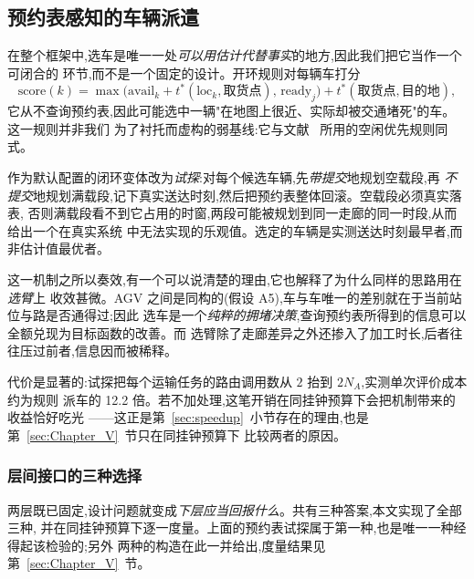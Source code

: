 \documentclass[manuscript,screen,review]{acmart}
\newcommand{\CostMultBefore}{12.2}
\begin{document}
\subsection{预约表感知的车辆派遣}
\label{sec:dispatch}

在整个框架中,选车是唯一一处\emph{可以用估计代替事实}的地方,因此我们把它当作一个可闭合的
环节,而不是一个固定的设计。开环规则对每辆车打分
\begin{equation}
\label{eq:rule}
\mathrm{score}(k)=\max\bigl(\mathrm{avail}_k+t^{*}(\mathrm{loc}_k,\text{取货点}),\,
\mathrm{ready}_j\bigr)+t^{*}(\text{取货点},\text{目的地}),
\end{equation}
它从不查询预约表,因此可能选中一辆"在地图上很近、实际却被交通堵死"的车。这一规则并非我们
为了衬托而虚构的弱基线:它与文献~\cite{li2026framework} 所用的空闲优先规则同式。

作为默认配置的闭环变体改为\emph{试探}:对每个候选车辆,先\emph{带提交}地规划空载段,再
\emph{不提交}地规划满载段,记下真实送达时刻,然后把预约表整体回滚。空载段必须真实落表,
否则满载段看不到它占用的时窗,两段可能被规划到同一走廊的同一时段,从而给出一个在真实系统
中无法实现的乐观值。选定的车辆是实测送达时刻最早者,而非估计值最优者。

这一机制之所以奏效,有一个可以说清楚的理由,它也解释了为什么同样的思路用在\emph{选臂}上
收效甚微。AGV 之间是同构的(假设 A5),车与车唯一的差别就在于当前站位与路是否通得过;因此
选车是一个\emph{纯粹的拥堵决策},查询预约表所得到的信息可以全额兑现为目标函数的改善。而
选臂除了走廊差异之外还掺入了加工时长,后者往往压过前者,信息因而被稀释。

代价是显著的:试探把每个运输任务的路由调用数从 $2$ 抬到 $2N_A$,实测单次评价成本约为规则
派车的 \CostMultBefore{} 倍。若不加处理,这笔开销在同挂钟预算下会把机制带来的收益恰好吃光
——这正是第~\ref{sec:speedup}~小节存在的理由,也是第~\ref{sec:Chapter_V}~节只在同挂钟预算下
比较两者的原因。

\subsubsection{层间接口的三种选择}
\label{sec:interface}

两层既已固定,设计问题就变成\emph{下层应当回报什么}。共有三种答案,本文实现了全部三种,
并在同挂钟预算下逐一度量。上面的预约表试探属于第一种,也是唯一一种经得起该检验的;另外
两种的构造在此一并给出,度量结果见第~\ref{sec:Chapter_V}~节。
\end{document}
